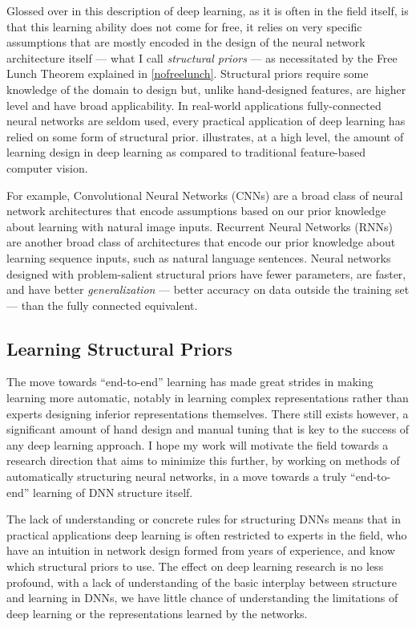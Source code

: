\documentclass[thesis]{subfiles}
\begin{document}
Glossed over in this description of deep learning, as it is often in the field itself, is that this learning ability does not come for free, it relies on very specific assumptions that are mostly encoded in the design of the neural network architecture itself --- what I call \emph{structural priors} --- as necessitated by the Free Lunch Theorem explained in \cref{nofreelunch}. Structural priors require some knowledge of the domain to design but, unlike hand-designed features, are higher level and have broad applicability. In real-world applications fully-connected neural networks are seldom used, every practical application of deep learning has relied on some form of structural prior.  illustrates, at a high level, the amount of learning \vs{}design in deep learning as compared to traditional feature-based computer vision.

For example, Convolutional Neural Networks (CNNs) are a broad class of neural network architectures that encode assumptions based on our prior knowledge about learning with natural image inputs. Recurrent Neural Networks (RNNs) are another broad class of architectures that encode our prior knowledge about learning sequence inputs, such as natural language sentences. Neural networks designed with problem-salient structural priors have fewer parameters, are faster, and have better \emph{generalization} --- better accuracy on data outside the training set --- than the fully connected equivalent.

\subsection{Learning Structural Priors}
The move towards ``end-to-end'' learning has made great strides in making learning more automatic, notably in learning complex representations rather than experts designing inferior representations themselves. There still exists however, a significant amount of hand design and manual tuning that is key to the success of any deep learning approach. I hope my work will motivate the field towards a research direction that aims to minimize this further, by working on methods of automatically structuring neural networks, in a move towards a truly ``end-to-end'' learning of DNN structure itself.

The lack of understanding or concrete rules for structuring DNNs means that in practical applications deep learning is often restricted to experts in the field, who have an intuition in network design formed from years of experience, and know which structural priors to use. The effect on deep learning research is no less profound, with a lack of understanding of the basic interplay between structure and learning in DNNs, we have little chance of understanding the limitations of deep learning or the representations learned by the networks. 
\end{document}
